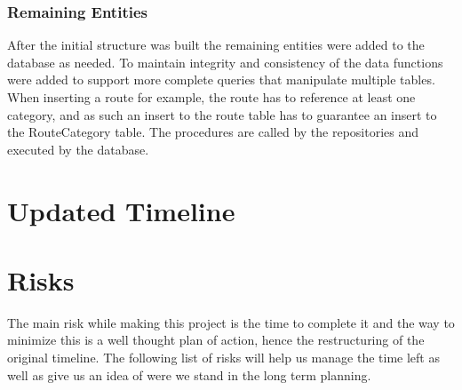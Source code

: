 \documentclass{article}
\begin{document}
            \subsubsection*{Remaining Entities}
            After the initial structure was built the remaining entities were added to the database as needed. To maintain integrity and consistency of the data functions were added to support more complete queries that manipulate multiple tables.
            When inserting a route for example, the route has to reference at least one category, and as such an insert to the route table has to guarantee an insert to the RouteCategory table. The procedures are called by the repositories and executed by the database.

            \newpage
        
    \section{Updated Timeline}
        \begin{figure}[H]
        \end{figure}
        \newpage

    \section{Risks}

        The main risk while making this project is the time to complete it and the way to minimize this is a well thought plan of action, hence the restructuring of the original timeline.
        The following list of risks will help us manage the time left as well as give us an idea of were we stand in the long term planning.
\end{document}
